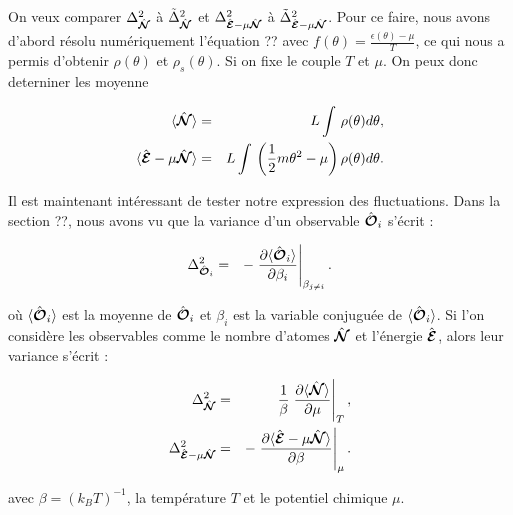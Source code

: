 {On veux comparer $\Delta_{\hat{\bm{\mathcal{N}}}}^2$ à $\tilde{\Delta}_{\hat{\bm{\mathcal{N}}}}^2$ et $\Delta_{\hat{\bm{\mathcal{E}}}-\mu \hat{\bm{\mathcal{N}}}}^2$ à $\tilde{\Delta}_{\hat{\bm{\mathcal{E}}}-\mu \hat{\bm{\mathcal{N}}}}^2 $. Pour ce faire, nous avons d'abord résolu numériquement l'équation {??} avec \( f(\theta) = \frac{\epsilon(\theta) - \mu}{T} \),  ce qui nous a permis d'obtenir \( \rho(\theta) \) et \( \rho_s(\theta) \). Si on fixe le couple $T$ et $\mu$. On peux donc deterniner les moyenne 

\begin{eqnarray*}
	\langle \hat{\bm{\mathcal{N}}} \rangle & = & L \int \, \rho(\theta) d \theta ,\\
	\langle \hat{\bm{\mathcal{E}}} - \mu \hat{\bm{\mathcal{N}}}\rangle & = & L \int \, \left (\frac{1}2 m \theta^2 - \mu  \right ) \rho(\theta) d\theta . 		
\end{eqnarray*}

}

Il est maintenant intéressant de tester notre expression des fluctuations. 
Dans la section {??}, nous avons vu que la variance d'un observable \( \hat{\bm{\mathcal{O}}}_i \) s'écrit :

\begin{eqnarray*}
    \Delta_{\hat{\bm{\mathcal{O}}}_i}^2 &=& - \left. \frac{\partial \langle \hat{\bm{\mathcal{O}}}_i \rangle}{\partial \beta_i} \right|_{\beta_{j \neq i}}.
\end{eqnarray*}

où \( \langle \hat{\bm{\mathcal{O}}}_i \rangle \) est la moyenne de \( \hat{\bm{\mathcal{O}}}_i \) et \( \beta_i \) est la variable conjuguée de \( \langle \hat{\bm{\mathcal{O}}}_i \rangle \). Si l'on considère les observables comme le nombre d'atomes \( \hat{\bm{\mathcal{N}}} \) et l'énergie \( \hat{\bm{\mathcal{E}}} \), alors leur variance s'écrit :

\begin{eqnarray*}
    \Delta_{\hat{\bm{\mathcal{N}}}}^2 &=& \frac{1}{\beta} \left. \frac{\partial \langle \hat{\bm{\mathcal{N}}} \rangle}{\partial \mu} \right|_T, \\
    \Delta_{\hat{\bm{\mathcal{E}}} - \mu \hat{\bm{\mathcal{N}}}}^2 &=& - \left. \frac{\partial \langle \hat{\bm{\mathcal{E}}} - \mu \hat{\bm{\mathcal{N}}} \rangle}{\partial \beta} \right|_\mu.
\end{eqnarray*}

avec \( \beta = (k_B T)^{-1} \), la température \( T \) et le potentiel chimique \( \mu \).

